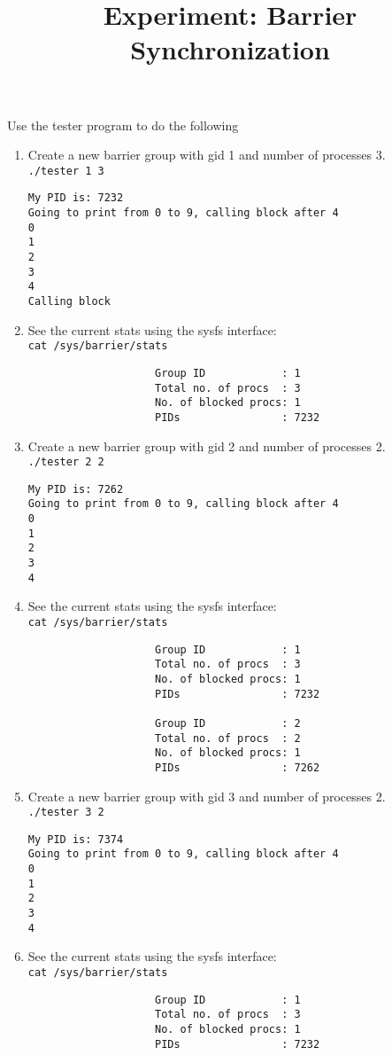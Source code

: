 \documentclass[10px]{article}
\title{Experiment: Barrier Synchronization}
\date{}
\begin{document}
\maketitle
Use the tester program to do the following
\begin{enumerate}
\item Create a new barrier group with gid 1 and number of processes 3.\\
\texttt{./tester 1 3}
\begin{verbatim}
My PID is: 7232
Going to print from 0 to 9, calling block after 4
0
1
2
3
4
Calling block
\end{verbatim}
\item See the current stats using the sysfs interface:\\
\texttt{cat /sys/barrier/stats}
\begin{verbatim}
                    Group ID            : 1
                    Total no. of procs  : 3
                    No. of blocked procs: 1
                    PIDs                : 7232 
\end{verbatim}
\item Create a new barrier group with gid 2 and number of processes 2.\\
\texttt{./tester 2 2}
\begin{verbatim}
My PID is: 7262
Going to print from 0 to 9, calling block after 4
0
1
2
3
4
\end{verbatim}
\item See the current stats using the sysfs interface:\\
\texttt{cat /sys/barrier/stats}
\begin{verbatim}
                    Group ID            : 1
                    Total no. of procs  : 3
                    No. of blocked procs: 1
                    PIDs                : 7232 

                    Group ID            : 2
                    Total no. of procs  : 2
                    No. of blocked procs: 1
                    PIDs                : 7262 
\end{verbatim}
\item Create a new barrier group with gid 3 and number of processes 2.\\
\texttt{./tester 3 2}
\begin{verbatim}
My PID is: 7374
Going to print from 0 to 9, calling block after 4
0
1
2
3
4
\end{verbatim}
\item See the current stats using the sysfs interface:\\
\texttt{cat /sys/barrier/stats}
\begin{verbatim}
                    Group ID            : 1
                    Total no. of procs  : 3
                    No. of blocked procs: 1
                    PIDs                : 7232 


\end{verbatim}
\end{enumerate}
\end{document}
